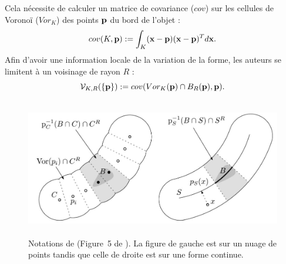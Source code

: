 Cela nécessite de calculer un matrice de covariance ($cov$) sur les cellules de
Voronoï ($Vor_K$) des points $\mathbf{p}$ du bord de l'objet :
%
\begin{equation}
    cov(K,\mathbf{p}) := \int_K (\mathbf{x} - \mathbf{p})(\mathbf{x} - \mathbf{p})^T d\mathbf{x} .
\end{equation}
%
Afin d'avoir une information locale de la variation de la forme, les auteurs se
limitent à un voisinage de rayon $R$ :
%
\begin{equation}
  \mathcal{V}_{K,R}(\{\mathbf{p}\}) := cov(Vor_K(\mathbf{p}) \cap B_{R}(\mathbf{p}), \mathbf{p}) .
\end{equation}

\begin{figure}[ht]{
    \begin{center}
    \includegraphics[height=6cm]{images/Feature/VCM_notations}
    \end{center}}
    \caption[Notations de \VCM.]{Notations de \VCM (Figure~5 de \cite{Merigot2011}). La figure de gauche est sur un nuage de points tandis que celle de droite est sur une forme continue. \label{fig:mellado-multiscale}}
\end{figure}

